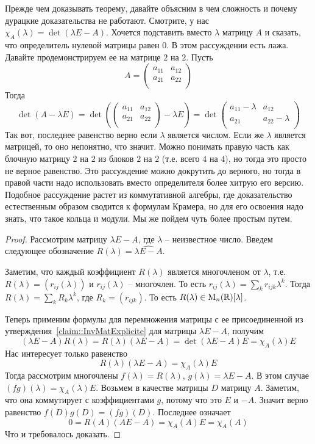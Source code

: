 Прежде чем доказывать теорему, давайте объясним в чем сложность и почему дурацкие доказательства не работают. Смотрите, у нас $\chi_A(\lambda) = \det(\lambda E - A)$. Хочется подставить вместо $\lambda$ матрицу $A$ и сказать, что определитель нулевой матрицы равен $0$. В этом рассуждении есть лажа. Давайте продемонстрируем ее на матрице $2$ на $2$. Пусть
\[
A = 
\begin{pmatrix}
{a_{11}}&{a_{12}}\\
{a_{21}}&{a_{22}}\\
\end{pmatrix}
\]
Тогда
\[
\det(A-\lambda E) =
\det
\left(
\begin{pmatrix}
{a_{11}}&{a_{12}}\\
{a_{21}}&{a_{22}}\\
\end{pmatrix}
-\lambda E
\right)=
\det 
\begin{pmatrix}
{a_{11}-\lambda}&{a_{12}}\\
{a_{21}}&{a_{22}-\lambda}\\
\end{pmatrix}
\]
Так вот, последнее равенство верно если $\lambda$ является числом. Если же $\lambda$ является матрицей, то оно непонятно, что значит. Можно понимать правую часть как блочную матрицу $2$ на $2$ из блоков $2$ на $2$ (т.е. всего $4$ на $4$), но тогда это просто не верное равенство. Это рассуждение можно докрутить до верного, но тогда в правой части надо использовать вместо определителя более хитрую его версию. Подобное рассуждение растет из коммутативной алгебры, где доказательство естественным образом сводится к формулам Крамера, но для его освоения надо знать, что такое кольца и модули. Мы же пойдем чуть более простым путем.

\begin{proof}
Рассмотрим матрицу $\lambda E - A$, где $\lambda$ -- неизвестное число. Введем следующее обозначение $R(\lambda) = \widehat{\lambda E - A}$. 

Заметим, что каждый коэффициент $R(\lambda)$ является многочленом от $\lambda$, т.е. $R(\lambda) = (r_{ij}(\lambda))$ и $r_{ij}(\lambda)$ -- многочлен. То есть $r_{ij}(\lambda) = \sum_k r_{ijk}\lambda^k$. Тогда $R(\lambda) = \sum_k R_k \lambda^k$, где $R_k=(r_{ijk})$. То есть $R(\lambda)\in\operatorname{M}_{n}(\mathbb R)[\lambda]$. 

Теперь применим формулы для перемножения матрицы с ее присоединенной из утверждения~\ref{claim::InvMatExplicite} для матрицы $\lambda E - A$, получим 
\[
(\lambda E - A)R(\lambda) = R(\lambda)(\lambda E - A) = \det(\lambda E - A)E=\chi_A(\lambda)E
\]
Нас интересует только равенство
\[
R(\lambda)(\lambda E - A) = \chi_A(\lambda)E
\]
Тогда рассмотрим многочлены $f(\lambda) = R(\lambda)$, $g(\lambda) = \lambda E  - A$. В этом случае $(fg)(\lambda) = \chi_A(\lambda)E$. Возьмем в качестве матрицы $D$ матрицу $A$. Заметим, что она коммутирует с коэффициентами $g$, потому что это $E$ и $-A$. Значит верно равенство $f(D)g(D) = (fg)(D)$. Последнее означает
\[
0 = R(A)(A E - A) = \chi_A(A) E = \chi_A(A)
\]
Что и требовалось доказать.
\end{proof}


